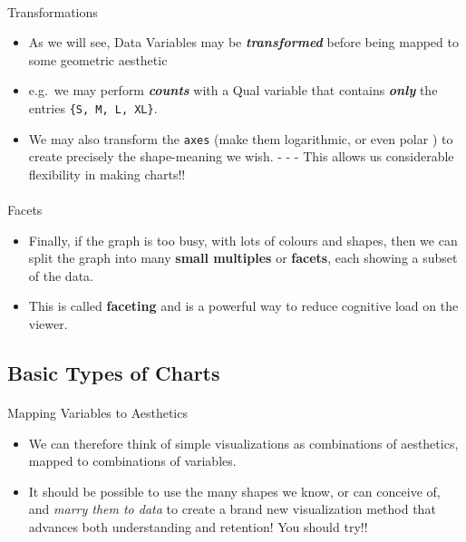 \documentclass[
  letterpaper,
  DIV=11,
  numbers=noendperiod]{scrartcl}
\makeatletter
\let\oldparagraph\paragraph
\renewcommand{\paragraph}{
    \@ifstar
      \xxxParagraphStar
      \xxxParagraphNoStar
  }
\newcommand{\xxxParagraphStar}[1]{\oldparagraph*{#1}\mbox{}}
\newcommand{\xxxParagraphNoStar}[1]{\oldparagraph{#1}\mbox{}}
\providecommand{\tightlist}{%
  \setlength{\itemsep}{0pt}\setlength{\parskip}{0pt}}
\makeatother
\begin{document}
\paragraph{Transformations}\label{transformations}

\begin{itemize}
\tightlist
\item
  As we will see, Data Variables may be \textbf{\emph{transformed}}
  before being mapped to some geometric aesthetic
\item
  e.g.~we may perform \textbf{\emph{counts}} with a Qual variable that
  contains \textbf{\emph{only}} the entries \texttt{\{S,\ M,\ L,\ XL\}}.
\item
  We may also transform the \texttt{axes} (make them logarithmic, or
  even polar ) to create precisely the shape-meaning we wish. - - - This
  allows us considerable flexibility in making charts!!
\end{itemize}

\paragraph{Facets}\label{facets}

\begin{itemize}
\tightlist
\item
  Finally, if the graph is too busy, with lots of colours and shapes,
  then we can split the graph into many \textbf{small multiples} or
  \textbf{facets}, each showing a subset of the data.
\item
  This is called \textbf{faceting} and is a powerful way to reduce
  cognitive load on the viewer.
\end{itemize}

\subsection{\texorpdfstring{ Basic Types of
Charts}{ Basic Types of Charts}}\label{sec-data-viz}

\paragraph{Mapping Variables to
Aesthetics}\label{mapping-variables-to-aesthetics}

\begin{itemize}
\tightlist
\item
  We can therefore think of simple visualizations as {combinations of
  aesthetics, mapped to combinations of variables}.
\item
  It should be possible to use the many shapes we know, or can conceive
  of, and \emph{marry them to data} to create a brand new visualization
  method that advances both understanding and retention! You should
  try!!
\end{itemize}
\end{document}
